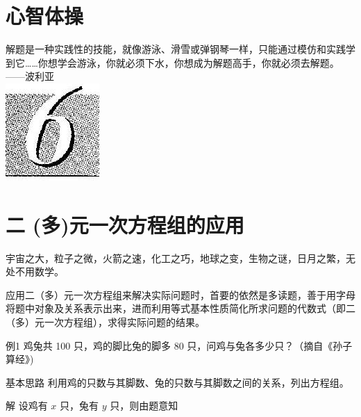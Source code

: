 \documentclass[10pt]{article}
\begin{document}
\section*{心智体操}
解题是一种实践性的技能，就像游泳、滑雪或弹钢琴一样，只能通过模仿和实践学到它……你想学会游泳，你就必须下水，你想成为解题高手，你就必须去解题。\\
——波利亚\\
\includegraphics[max width=\textwidth, center]{2024_10_30_26b590fd1106d28139f0g-032}

\section*{二 (多)元一次方程组的应用}
宇宙之大，粒子之微，火箭之速，化工之巧，地球之变，生物之谜，日月之繁，无处不用数学。

应用二（多）元一次方程组来解决实际问题时，首要的依然是多读题，善于用字母将题中对象及关系表示出来，进而利用等式基本性质简化所求问题的代数式（即二（多）元一次方程组），求得实际问题的结果。

例1 鸡兔共 100 只，鸡的脚比兔的脚多 80 只，问鸡与兔各多少只？（摘自《孙子算经》)

基本思路 利用鸡的只数与其脚数、兔的只数与其脚数之间的关系，列出方程组。

解 设鸡有 $x$ 只，兔有 $y$ 只，则由题意知
\end{document}
